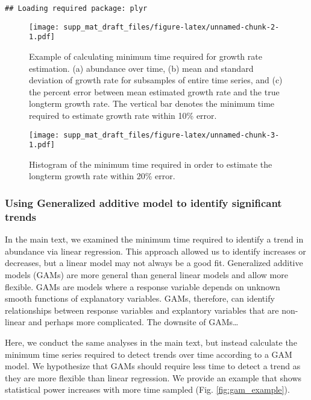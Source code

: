 \documentclass[12pt,]{article}
\begin{document}
\begin{verbatim}
## Loading required package: plyr
\end{verbatim}

\begin{figure}[htbp]
\centering
\texttt{[image: supp\_mat\_draft\_files/figure-latex/unnamed-chunk-2-1.pdf]}
\caption{Example of calculating minimum time required for growth rate
estimation. (a) abundance over time, (b) mean and standard deviation of
growth rate for subsamples of entire time series, and (c) the percent
error between mean estimated growth rate and the true longterm growth
rate. The vertical bar denotes the minimum time required to estimate
growth rate within 10\% error.\label{fig:growth_rate}}
\end{figure}

\begin{figure}[htbp]
\centering
\texttt{[image: supp\_mat\_draft\_files/figure-latex/unnamed-chunk-3-1.pdf]}
\caption{Histogram of the minimum time required in order to estimate the
longterm growth rate within 20\% error.\label{fig:min_time_dist}}
\end{figure}

\subsubsection{Using Generalized additive model to identify significant
trends}\label{using-generalized-additive-model-to-identify-significant-trends}

In the main text, we examined the minimum time required to identify a
trend in abundance via linear regression. This approach allowed us to
identify increases or decreases, but a linear model may not always be a
good fit. Generalized additive models (GAMs) are more general than
general linear models and allow more flexible. GAMs are models where a
response variable depends on unknown smooth functions of explanatory
variables. GAMs, therefore, can identify relationships between response
variables and explantory variables that are non-linear and perhaps more
complicated. The downsite of GAMs\ldots{}

Here, we conduct the same analyses in the main text, but instead
calculate the minimum time series required to detect trends over time
according to a GAM model. We hypothesize that GAMs should require less
time to detect a trend as they are more flexible than linear regression.
We provide an example that shows statistical power increases with more
time sampled (Fig. \ref{fig:gam_example}).
\end{document}
